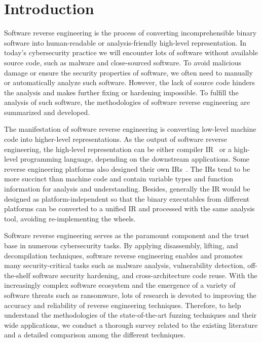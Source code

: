 \chapter{Introduction}\label{sec-introduction}


Software reverse engineering is the process of converting incomprehensible
binary software into human-readable or analysis-friendly high-level
representation. In today's cybersecurity practice we will encounter lots of
software without available source code, such as malware and close-sourced
software. To avoid malicious damage or ensure the security properties of
software, we often need to manually or automatically analyze such software.
However, the lack of source code hinders the analysis and makes further fixing
or hardening impossible.
To fulfill the analysis of such software, the methodologies of software reverse
engineering are summarized and developed.


The manifestation of software reverse engineering is converting low-level
machine code into higher-level representations. As the output of software
reverse engineering, the high-level representation can be either compiler
IR~\cite{llvm-ir} or a high-level programming language, depending on the
downstream applications. Some reverse engineering platforms also designed their
own IRs~\cite{vex-ir,bap-ir}. The IRs tend to be more succinct than
machine code and contain variable types and function information for analysis
and understanding. Besides, generally the IR would be designed as
platform-independent so that the binary executables from different platforms
can be converted to a unified IR and processed with the same analysis tool,
avoiding re-implementing the wheels.


Software reverse engineering serves as the paramount component and the trust
base in numerous cybersecurity tasks. By applying disassembly, lifting, and
decompilation techniques, software reverse engineering enables and promotes
many security-critical tasks such as malware analysis, vulnerability detection,
off-the-shelf software security hardening, and cross-architecture code reuse.
With the increasingly complex software ecosystem and the emergence of a variety
of software threats such as ransomware, lots of research is devoted to improving
the accuracy and reliability of reverse engineering techniques. Therefore, to
help understand the methodologies of the state-of-the-art fuzzing techniques
and their wide applications, we conduct a thorough survey related to the
existing literature and a detailed comparison among the different techniques.

